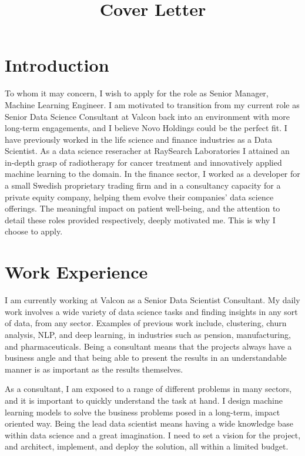 
\title{Cover Letter}



\newcommand{\role}{Senior Manager, Machine Learning Engineer}
\newcommand{\company}{Novo Holdings}


\makecvtitle


\section{Introduction}
To whom it may concern, I wish to apply for the role as \role{}.
I am motivated to transition from my current role as Senior Data Science Consultant at Valcon back into an environment with more long-term engagements, and I believe \company{} could be the perfect fit.
I have previously worked in the life science and finance industries as a Data Scientist.
As a data science reseracher at RaySearch Laboratories I attained an in-depth grasp of radiotherapy for cancer treatment and innovatively applied machine learning to the domain.
In the finance sector, I worked as a developer for a small Swedish proprietary trading firm and in a consultancy capacity for a private equity company, helping them evolve their companies' data science offerings.
The meaningful impact on patient well-being, and the attention to detail these roles provided respectively, deeply motivated me.
This is why I choose to apply.

\section{Work Experience}
I am currently working at Valcon as a Senior Data Scientist Consultant.
My daily work involves a wide variety of data science tasks and finding insights in any sort of data, from any sector.
Examples of previous work include, clustering, churn analysis, NLP, and deep learning, in industries such as pension, manufacturing, and pharmaceuticals.
Being a consultant means that the projects always have a business angle and that being able to present the results in an understandable manner is as important as the results themselves.

\hspace{7 mm} As a consultant, I am exposed to a range of different problems in many sectors, and it is important to quickly understand the task at hand.
I design machine learning models to solve the business problems posed in a long-term, impact oriented way.
Being the lead data scientist means having a wide knowledge base within data science and a great imagination.
I need to set a vision for the project, and architect, implement, and deploy the solution, all within a limited budget.

